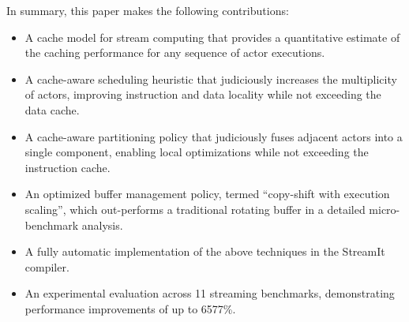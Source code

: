 In summary, this paper makes the following contributions:
\begin{itemize}

\item A cache model for stream computing that provides a quantitative
estimate of the caching performance for any sequence of actor
executions.

\item A cache-aware scheduling heuristic that judiciously increases
the multiplicity of actors, improving instruction and data locality
while not exceeding the data cache.

\item A cache-aware partitioning policy that judiciously fuses
adjacent actors into a single component, enabling local optimizations
while not exceeding the instruction cache.

\item An optimized buffer management policy, termed ``copy-shift with
execution scaling'', which out-performs a traditional rotating buffer
in a detailed micro-benchmark analysis.

\item A fully automatic implementation of the above techniques in the
StreamIt compiler.

\item An experimental evaluation across 11 streaming benchmarks,
demonstrating performance improvements of up to 6577\%.
\end{itemize}



